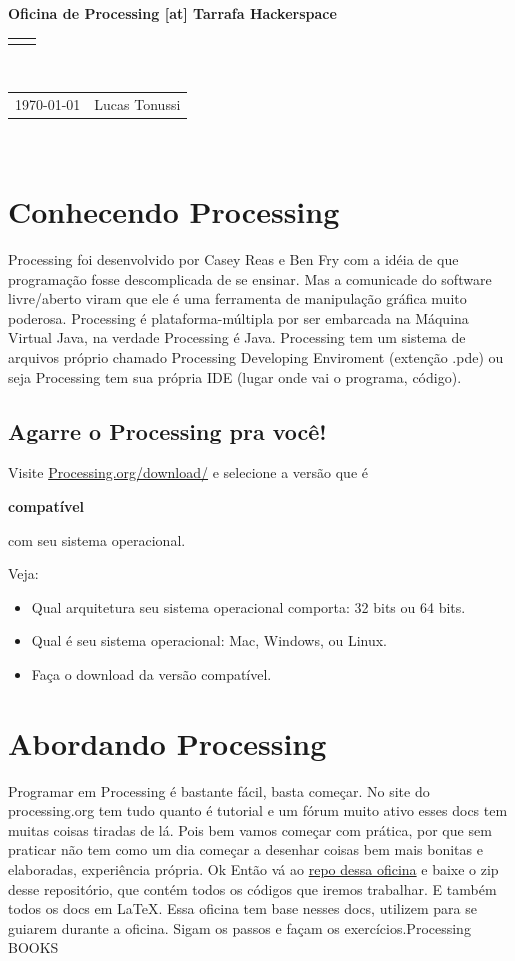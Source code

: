 \documentclass[12pt]{article}
\renewcommand{\title}[1]{\textbf{#1}\\}
\renewcommand{\line}{\begin{tabularx}{\textwidth}{X>{\raggedleft}X}\hline\\\end{tabularx}\\[-0.5cm]}
\newcommand{\leftright}[2]{\begin{tabularx}{\textwidth}{X>{\raggedleft}X}#1%
& #2\\\end{tabularx}\\[-0.5cm]}
\begin{document}
\title{Oficina de Processing [at] Tarrafa Hackerspace}
\line
\leftright{\today}{Lucas Tonussi}

\section{Conhecendo Processing}

\qquad Processing foi desenvolvido por Casey Reas e Ben Fry com a idéia de que programação fosse descomplicada de se ensinar. Mas a comunicade do software livre/aberto viram que ele é uma ferramenta de manipulação gráfica muito poderosa. Processing é plataforma-múltipla por ser embarcada na Máquina Virtual Java, na verdade Processing é Java. Processing tem um sistema de arquivos próprio chamado Processing Developing Enviroment (extenção .pde) ou seja Processing tem sua própria IDE (lugar onde vai o programa, código).

\subsection{Agarre o Processing pra você!}

\qquad Visite \href{http://processing.org/download/}{Processing.org/download/} e selecione a versão que é \begin{Large}\textbf{compatível}\end{Large} com seu sistema operacional.

\qquad Veja:
\begin{itemize}
\item Qual arquitetura seu sistema operacional comporta: 32 bits ou 64 bits.
\item Qual é seu sistema operacional: Mac, Windows, ou Linux.
\item Faça o download da versão compatível.
\end{itemize}

\section{Abordando Processing}

\qquad Programar em Processing é bastante fácil, basta começar. No site do processing.org tem tudo quanto é tutorial e um fórum muito ativo esses docs tem muitas coisas tiradas de lá. Pois bem vamos começar com prática, por que sem praticar não tem como um dia começar a desenhar coisas bem mais bonitas e elaboradas, experiência própria. Ok Então vá ao \href{https://github.com/tonussi/oficinas/}{repo dessa oficina} e baixe o zip desse repositório, que contém todos os códigos que iremos trabalhar. E também todos os docs em \LaTeX. Essa oficina tem base nesses docs, utilizem para se guiarem durante a oficina. Sigam os passos e façam os exercícios.Processing BOOKS
\end{document}
